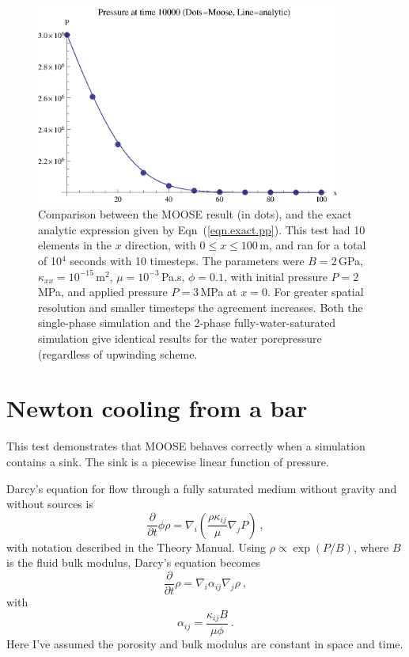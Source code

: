\documentclass[]{scrreprt}
\begin{document}
\begin{figure}[htb]
\centering
\includegraphics[width=10cm]{pressure_pulse.eps}
\caption{Comparison between the MOOSE result (in dots), and the
  exact analytic expression given by Eqn~(\ref{eqn.exact.pp}).  This
  test had 10 elements in the $x$ direction, with $0\leq x \leq
  100$\,m, and ran for a total of 
  10$^4$ seconds with 10 timesteps.  The parameters were $B=2$\,GPa,
  $\kappa_{xx}=10^{-15}$\,m$^{2}$, $\mu=10^{-3}$\,Pa.s, $\phi=0.1$,
  with initial pressure $P=2$\,MPa, and applied pressure $P=3$\,MPa at
  $x=0$.  For greater spatial resolution and smaller timesteps the
  agreement increases.  Both the single-phase simulation and the
  2-phase fully-water-saturated simulation give identical results for
  the water porepressure (regardless of upwinding scheme.}
\label{pressure_pulse.fig}
\end{figure}



\chapter{Newton cooling from a bar}
\label{nc}

This test demonstrates that MOOSE behaves correctly when a simulation
contains a sink.  The sink is a piecewise linear function of pressure.

Darcy's equation for flow through a fully saturated medium without
gravity and without sources is 
\begin{equation}
\frac{\partial}{\partial t}\phi\rho = \nabla_{i}\left(\frac{\rho
  \kappa_{ij}}{\mu} \nabla_{j}P \right) \ ,
\end{equation}
with notation described in the Theory Manual.  Using $\rho \propto
\exp(P/B)$, where $B$ is the fluid bulk modulus, Darcy's equation
becomes
\begin{equation}
\frac{\partial}{\partial t}\rho = \nabla_{i}\alpha_{ij}\nabla_{j}\rho \ ,
\end{equation}
with 
\begin{equation}
\alpha_{ij} = \frac{\kappa_{ij}B}{\mu\phi} \ .
\end{equation}
Here I've assumed the porosity and bulk modulus are constant in space
and time.
\end{document}
